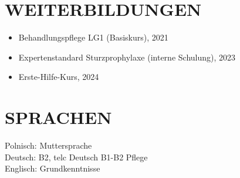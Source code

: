\documentclass[11pt,a4paper]{article}
\newcommand{\cvsection}[1]{\section*{#1}}
\begin{document}
\cvsection{WEITERBILDUNGEN}
\begin{itemize}
\item Behandlungspflege LG1 (Basiskurs), 2021
\item Expertenstandard Sturzprophylaxe (interne Schulung), 2023
\item Erste-Hilfe-Kurs, 2024
\end{itemize}

\cvsection{SPRACHEN}
Polnisch: Muttersprache\\
Deutsch: B2, telc Deutsch B1-B2 Pflege\\
Englisch: Grundkenntnisse
\end{document}
